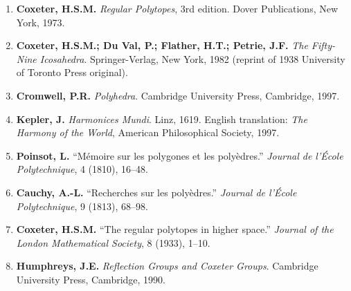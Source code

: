 \begin{enumerate}
  \item \textbf{Coxeter, H.S.M.} \emph{Regular Polytopes}, 3rd edition.
        Dover Publications, New York, 1973.
        \cite{coxeter_regular_polytopes}

  \item \textbf{Coxeter, H.S.M.; Du Val, P.; Flather, H.T.; Petrie, J.F.}
        \emph{The Fifty-Nine Icosahedra}.
        Springer-Verlag, New York, 1982 (reprint of 1938 University
        of Toronto Press original).
        \cite{coxeter_fifty_nine_icosahedra}

  \item \textbf{Cromwell, P.R.}
        \emph{Polyhedra}.
        Cambridge University Press, Cambridge, 1997.
        \cite{cromwell_polyhedra}

  \item \textbf{Kepler, J.}
        \emph{Harmonices Mundi}.  Linz, 1619.
        English translation: \emph{The Harmony of the World},
        American Philosophical Society, 1997.

  \item \textbf{Poinsot, L.}
        ``Mémoire sur les polygones et les polyèdres.''
        \emph{Journal de l'École Polytechnique}, 4 (1810), 16--48.

  \item \textbf{Cauchy, A.-L.}
        ``Recherches sur les polyèdres.''
        \emph{Journal de l'École Polytechnique}, 9 (1813), 68--98.

  \item \textbf{Coxeter, H.S.M.}
        ``The regular polytopes in higher space.''
        \emph{Journal of the London Mathematical Society}, 8 (1933), 1--10.

  \item \textbf{Humphreys, J.E.}
        \emph{Reflection Groups and Coxeter Groups}.
        Cambridge University Press, Cambridge, 1990.
\end{enumerate}

%
%
%
